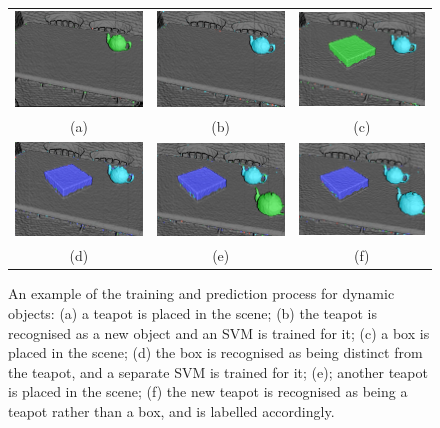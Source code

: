 \begin{figure}[ht]
  \label{fig:moseg_recognition}
  \centering
  \begin{tabular}{ccc}
    \includegraphics[width=.28\linewidth]{figures/moseg/objects1.png} &
    \includegraphics[width=.28\linewidth]{figures/moseg/objects2.png} &
    \includegraphics[width=.28\linewidth]{figures/moseg/objects3.png} \\ 
    (a) & (b) & (c) \\
    \includegraphics[width=.28\linewidth]{figures/moseg/objects4.png} &
    \includegraphics[width=.28\linewidth]{figures/moseg/objects5.png} &
    \includegraphics[width=.28\linewidth]{figures/moseg/objects6.png} \\ 
    (d) & (e) & (f) \\
  \end{tabular}
  \caption[Motion Segmentation Object Recognition]
  {An example of the training and prediction process for dynamic
    objects:
    (a) a teapot is placed in the scene;
    (b) the teapot is recognised as a new object and an SVM is trained for it;
    (c) a box is placed in the scene; (d) the box is recognised as being
    distinct from the teapot, and a separate SVM is trained for it;
    (e); another teapot is placed in the scene; (f) the new teapot is recognised
    as being a teapot rather than a box, and is labelled accordingly.}
\end{figure}